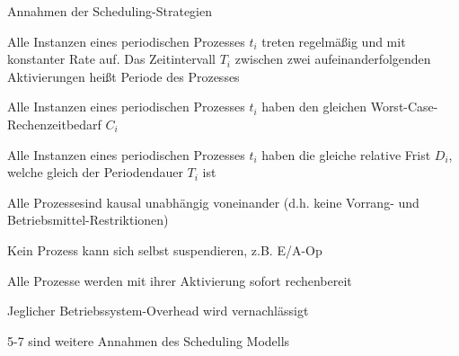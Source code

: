 \documentclass[a4paper]{article}
\begin{document}
\begin{multicols}{3}
    Annahmen der Scheduling-Strategien
    \begin{enumerate*}
        \item Alle Instanzen eines periodischen Prozesses $t_i$ treten regelmäßig und mit konstanter Rate auf. Das Zeitintervall $T_i$ zwischen zwei aufeinanderfolgenden Aktivierungen heißt Periode des Prozesses
        \item Alle Instanzen eines periodischen Prozesses $t_i$ haben den gleichen Worst-Case-Rechenzeitbedarf $C_i$
        \item Alle Instanzen eines periodischen Prozesses $t_i$ haben die gleiche relative Frist $D_i$, welche gleich der Periodendauer $T_i$ ist
        \item Alle Prozessesind kausal unabhängig voneinander (d.h. keine Vorrang- und Betriebsmittel-Restriktionen)
        \item Kein Prozess kann sich selbst suspendieren, z.B. E/A-Op
        \item Alle Prozesse werden mit ihrer Aktivierung sofort rechenbereit
        \item Jeglicher Betriebssystem-Overhead wird vernachlässigt
    \end{enumerate*}
    5-7 sind weitere Annahmen des Scheduling Modells


\end{multicols}
\end{document}
